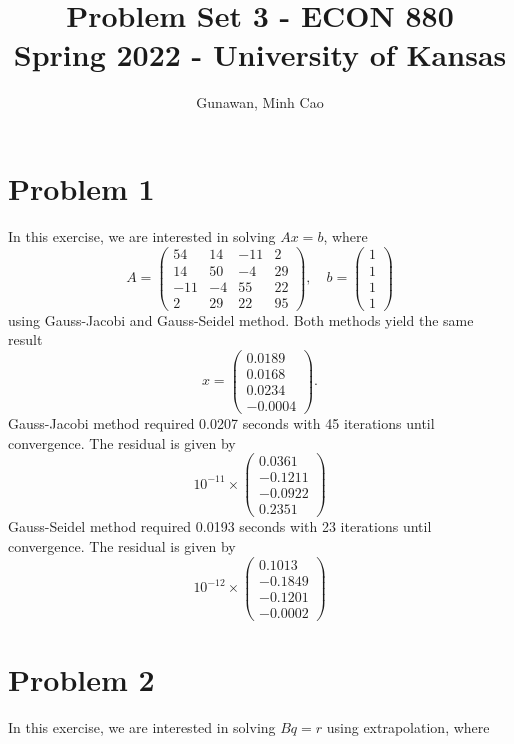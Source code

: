 \documentclass[11pt]{article}
\title{Problem Set 3 - ECON 880\\
	\small Spring 2022 - University of Kansas}
\author{Gunawan, Minh Cao}
\newcommand{\1}{\mathbbm{1}}
\begin{document}
\maketitle	

\section*{Problem 1}
In this exercise, we are interested in solving $Ax=b$, where
\[A = \begin{pmatrix}
	54 &14& -11& 2 \\ 14 &50& -4& 29 \\ -11 &-4 &55& 22 \\ 2& 29& 22& 95
\end{pmatrix}, \quad b = \begin{pmatrix}
	1\\1\\1\\1
\end{pmatrix} \]
using Gauss-Jacobi and Gauss-Seidel method. Both methods yield the same result
\[x = \begin{pmatrix}
	0.0189\\
	0.0168\\
	0.0234\\
	-0.0004
\end{pmatrix}.\]
Gauss-Jacobi method required 0.0207 seconds with 45 iterations until convergence. The residual is given by
\[
10^{-11} \times \begin{pmatrix}
	0.0361\\
	-0.1211\\
	-0.0922\\
	0.2351
\end{pmatrix}
\]
Gauss-Seidel method required 0.0193 seconds with 23 iterations until convergence. The residual is given by
\[10^{-12}\times \begin{pmatrix}
	0.1013\\
	-0.1849\\
	-0.1201\\
	-0.0002
\end{pmatrix}\]
   
\section*{Problem 2}
In this exercise, we are interested in solving $Bq=r$ using extrapolation, where
\end{document}
